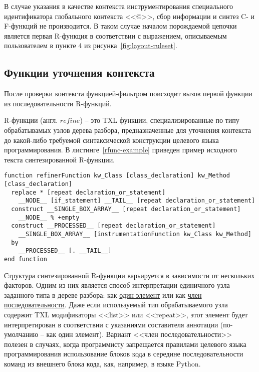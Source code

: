 В случае указания в качестве контекста инструментирования специального идентификатора глобального контекста <<@>>, сбор информации и синтез C- и F-функций не производится.
В таком случае началом порождаемой цепочки является первая R-функция в соответствии с выражением, описываемым пользователем в пункте 4 из рисунка~\ref{fig:layout-ruleset}.

\subsection{Функции уточнения контекста}

После проверки контекста функцией-фильтром поисходит вызов первой функции из последовательности R-функций.

R-функции (англ. $refine$) -- это TXL функции, специализированные по типу обрабатывамых узлов дерева разбора, предназначенные для уточнения контекста до какой-либо требуемой синтаксической конструкции целевого языка программирования.
В листинге~\ref{rfunc-example} приведен пример исходного текста синтезированной R-функции.

\begin{lstlisting}[frame=single, language=TXL, label={rfunc-example}, caption={Пример синтезированной R-функции.}]
function refinerFunction kw_Class [class_declaration] kw_Method [class_declaration]
  replace * [repeat declaration_or_statement]
    __NODE__ [if_statement] __TAIL__ [repeat declaration_or_statement]
  construct __SINGLE_BOX_ARRAY__ [repeat declaration_or_statement]
    __NODE__ % +empty
  construct __PROCESSED__ [repeat declaration_or_statement]
    __SINGLE_BOX_ARRAY__ [instrumentationFunction kw_Class kw_Method]
  by
    __PROCESSED__ [. __TAIL__]
end function
\end{lstlisting}

Структура синтезированной R-функции варьируется в зависимости от нескольких факторов.
Одним из них является способ интерпретации единичного узла заданного типа в дереве разбора: как \underline{один элемент} или как \underline{член последовательности}.
Даже если используемый тип обрабатываемого узла содержит TXL модификаторы <<list>> или <<repeat>>, этот элемент будет интерпретирован в соответствии с указаниями составителя аннотации (по-умолчанию -- как один элемент).
Вариант <<член последовательности>> полезен в случаях, когда программисту запрещается правилами целевого языка программирования использование блоков кода в середине последовательности команд из внешнего блока кода, как, например, в языке Python.

